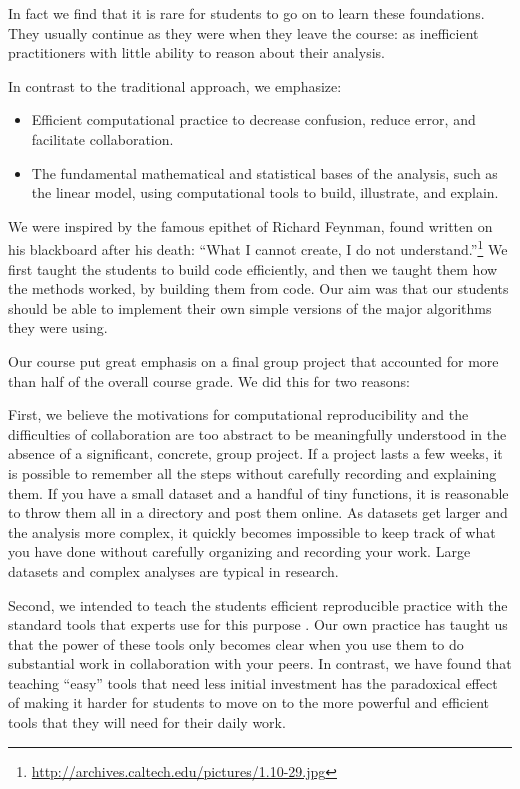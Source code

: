 In fact we find that it is rare for students to go on to learn these
foundations. They usually continue as they were when they leave the course:
as inefficient practitioners with little ability to reason about their
analysis.

In contrast to the traditional approach, we emphasize:

\begin{itemize}

\item
    Efficient computational practice to decrease confusion, reduce error, and
    facilitate collaboration.

\item
    The fundamental mathematical and statistical bases of the analysis, such
    as the linear model, using computational tools to build, illustrate, and
    explain.

\end{itemize}

We were inspired by the famous epithet of Richard Feynman, found written on
his blackboard after his death: ``What I cannot create, I do not
understand.''\footnote{\url{http://archives.caltech.edu/pictures/1.10-29.jpg}}
We first taught the students to build code efficiently, and then we taught
them how the methods worked, by building them from code.  Our aim was that our
students should be able to implement their own simple versions of the major
algorithms they were using.

Our course put great emphasis on a final group project that accounted for more
than half of the overall course grade.  We did this for two reasons:

First, we believe the motivations for computational reproducibility and
the difficulties of collaboration are too abstract to be meaningfully
understood in the absence of a significant, concrete, group project.
If a project lasts a few weeks, it is
possible to remember all the steps without carefully recording and explaining
them.  If you have a small dataset and a handful of tiny functions, it is
reasonable to throw them all in a directory and post them online.  As datasets
get larger and the analysis more complex, it quickly becomes impossible to
keep track of what you have done without carefully organizing and
recording your work.  Large datasets and complex analyses are typical in research.

Second, we intended to teach the students efficient reproducible practice with
the standard tools that experts use for this purpose
\citep{millman2014developing}. Our own practice has taught us that the power
of these tools only becomes clear when you use them to do substantial work in
collaboration with your peers.  In contrast, we have found that teaching
``easy'' tools that need less initial investment has the paradoxical effect of
making it harder for students to move on to the more powerful and efficient
tools that they will need for their daily work.

